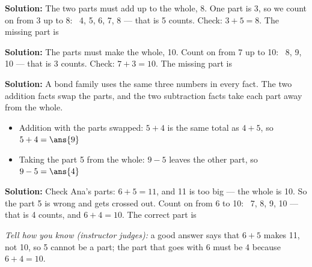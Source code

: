 \documentclass[12pt]{article}
\begin{document}




\textbf{Solution:} The two parts must add up to the whole, 8. One part is 3,
so we count on from 3 up to 8: \ 4, 5, 6, 7, 8 --- that is 5 counts.
Check: $3 + 5 = 8$. The missing part is 


\textbf{Solution:} The parts must make the whole, 10. Count on from 7 up to
10: \ 8, 9, 10 --- that is 3 counts. Check: $7 + 3 = 10$. The missing part
is 


\textbf{Solution:} A bond family uses the same three numbers in every fact.
The two addition facts swap the parts, and the two subtraction facts take
each part away from the whole.
\begin{itemize}[leftmargin=1.4cm, itemsep=2pt]
  \item Addition with the parts swapped: $5 + 4$ is the same total as
        $4 + 5$, so $5 + 4 = \ans{9}$
  \item Taking the part 5 from the whole: $9 - 5$ leaves the other part,
        so $9 - 5 = \ans{4}$
\end{itemize}


\textbf{Solution:} Check Ana's parts: $6 + 5 = 11$, and 11 is too big --- the
whole is 10. So the part 5 is wrong and gets crossed out. Count on from 6 to
10: \ 7, 8, 9, 10 --- that is 4 counts, and $6 + 4 = 10$. The correct part
is 

\emph{Tell how you know (instructor judges):} a good answer says that
$6+5$ makes 11, not 10, so 5 cannot be a part; the part that goes with 6 must
be 4 because $6+4=10$.
\end{document}

